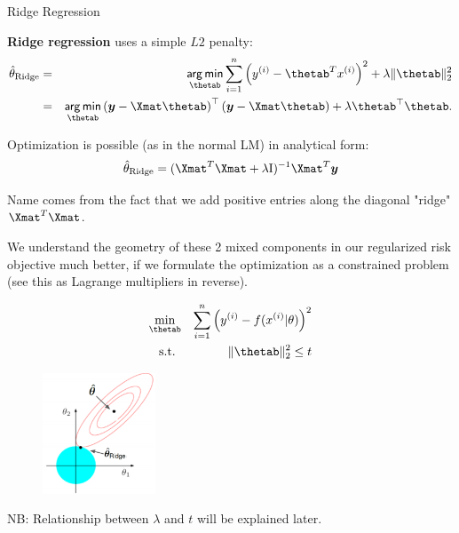 \begin{vbframe}{Ridge Regression}

  \textbf{Ridge regression} uses a simple $L2$ penalty:
  \begin{eqnarray*}  
  \thetah_{\text{Ridge}} &=& \argmin_{\thetab} \sumin \left(\yi - \thetab^T \xi \right)^2 + \lambda \|\thetab\|_2^2 \\
  &=& \argmin_{\thetab} \left(\yv - \Xmat \thetab\right)^\top \left(\yv - \Xmat \thetab\right) + \lambda \thetab^\top \thetab.
  \end{eqnarray*}

Optimization is possible (as in the normal LM) in analytical form:
$$\thetah_{\text{Ridge}} = ({\Xmat}^T \Xmat  + \lambda \id)^{-1} \Xmat^T\yv$$

Name comes from the fact that we add positive entries along the diagonal "ridge" $\Xmat^T \Xmat$.

\framebreak 

We understand the geometry of these 2 mixed components in our regularized risk objective much better, if we formulate the optimization as a constrained problem (see this as Lagrange multipliers in reverse).

\vspace{-0.5cm}

\begin{eqnarray*}
\min_{\thetab} && \sumin \left(\yi - \fxit\right)^2 \\
  \text{s.t. } && \|\thetab\|_2^2  \leq t \\
\end{eqnarray*}

\vspace{-1.0cm}

\begin{figure}
\includegraphics[width=0.3\textwidth]{figure_man/ridge_hat.png}
\end{figure}

\begin{footnotesize} 
NB: Relationship between $\lambda$ and $t$ will be explained later.
\end{footnotesize}


\end{vbframe}

